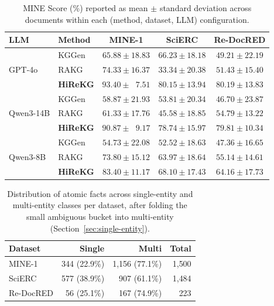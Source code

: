 \documentclass[11pt]{article}
\begin{document}
\begin{table}[t]
\centering
\small
\setlength{\tabcolsep}{4pt}
\renewcommand{\arraystretch}{1.15}
\begin{tabular}{ll|c|c|c}
\toprule
\textbf{LLM} & \textbf{Method} & \textbf{MINE-1} & \textbf{SciERC} & \textbf{Re-DocRED} \\
\midrule
\multirow{3}{*}{GPT-4o}
  & KGGen           & $65.88 \pm 18.83$ & $66.23 \pm 18.18$ & $49.21 \pm 22.19$ \\
  & RAKG            & $74.33 \pm 16.37$ & $33.34 \pm 20.38$ & $51.43 \pm 15.40$ \\
  & \textbf{HiReKG} & $\mathbf{93.40 \pm \phantom{0}7.51}$ & $\mathbf{80.15 \pm 13.94}$ & $\mathbf{80.19 \pm 13.83}$ \\
\midrule
\multirow{3}{*}{Qwen3-14B}
  & KGGen           & $58.87 \pm 21.93$ & $53.81 \pm 20.34$ & $46.70 \pm 23.87$ \\
  & RAKG            & $61.33 \pm 17.76$ & $45.58 \pm 18.85$ & $54.79 \pm 13.22$ \\
  & \textbf{HiReKG} & $\mathbf{90.87 \pm \phantom{0}9.17}$ & $\mathbf{78.74 \pm 15.97}$ & $\mathbf{79.81 \pm 10.34}$ \\
\midrule
\multirow{3}{*}{Qwen3-8B}
  & KGGen           & $54.73 \pm 22.08$ & $52.52 \pm 18.63$ & $47.36 \pm 16.65$ \\
  & RAKG            & $73.80 \pm 15.12$ & $63.97 \pm 18.64$ & $55.14 \pm 14.61$ \\
  & \textbf{HiReKG} & $\mathbf{83.40 \pm 11.17}$ & $\mathbf{68.10 \pm 17.43}$ & $\mathbf{64.16 \pm 17.73}$ \\
\bottomrule
\end{tabular}
\caption{MINE Score (\%) reported as mean $\pm$ standard deviation across documents within each (method, dataset, LLM) configuration.}
\label{tab:variance}
\end{table}

\begin{table}[h]
\centering
\small
\setlength{\tabcolsep}{6pt}
\renewcommand{\arraystretch}{1.15}
\begin{tabular}{l|rrr}
\toprule
\textbf{Dataset} & \textbf{Single} & \textbf{Multi} & \textbf{Total} \\
\midrule
MINE-1    & 344 (22.9\%) & 1{,}156 (77.1\%) & 1{,}500 \\
SciERC    & 577 (38.9\%) &   907  (61.1\%)  & 1{,}484 \\
Re-DocRED &  56 (25.1\%) &   167  (74.9\%)  & 223 \\
\bottomrule
\end{tabular}
\caption{Distribution of atomic facts across single-entity and multi-entity classes per dataset, after folding the small ambiguous bucket into multi-entity (Section~\ref{sec:single-entity}).}
\label{tab:fact-distribution}
\end{table}
\end{document}
